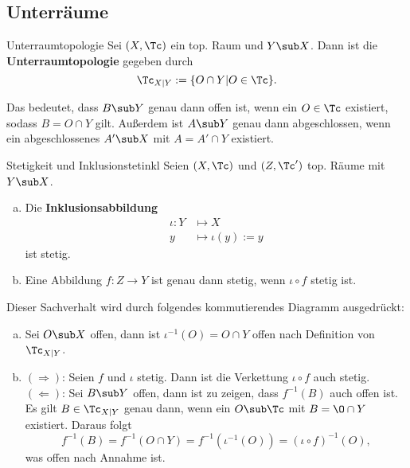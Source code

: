 \subsection{Unterräume}
\label{subsec:unterraeume}
\begin{definition}{Unterraumtopologie}
Sei $(X,\Tc)$ ein top. Raum und $Y \sub X$. Dann ist die \textbf{Unterraumtopologie} gegeben durch
\begin{equation}
\Tc_{X|Y} := \{O \cap Y|  O \in \Tc\}.
\end{equation}
\end{definition}
\begin{bemerkung}
Das bedeutet, dass $B \sub Y$ genau dann offen ist, wenn ein $O \in \Tc$ existiert, sodass $B = O \cap Y$ gilt. Außerdem ist $A \sub Y$ genau dann abgeschlossen, wenn ein abgeschlossenes $A' \sub X$ mit $A = A' \cap Y$ existiert.
\end{bemerkung}
\begin{satz}{Stetigkeit und Inklusion}{stetinkl}
Seien $(X,\Tc)$ und $(Z,\Tc')$ top. Räume mit $Y \sub X$.
\begin{enumerate}[(a)]
\item Die \textbf{Inklusionsabbildung}
\begin{equation}
\begin{split}
\iota: Y &\mapsto X\\
y &\mapsto \iota(y):=y
\end{split}
\end{equation}
ist stetig.
\item Eine Abbildung $f: Z \to Y$ ist genau dann stetig, wenn $\iota \circ f$ stetig ist.
\end{enumerate}
Dieser Sachverhalt wird durch folgendes kommutierendes Diagramm ausgedrückt:
\begin{center}
\end{center}
\end{satz}
\begin{beweis}
\begin{enumerate}[(a)]
\item Sei $O \sub X$ offen, dann ist $\iota^{-1}(O)=O \cap Y$ offen nach Definition von $\Tc_{X|Y}$.
\item $(\Rightarrow)$: Seien $f$ und $\iota$ stetig. Dann ist die Verkettung $\iota \circ f$ auch stetig.\\
$(\Leftarrow)$: Sei $B \sub Y$ offen, dann ist zu zeigen, dass $f^{-1}(B)$ auch offen ist. Es gilt $B \in \Tc_{X|Y}$ genau dann, wenn ein $O \sub \Tc$ mit $B = \O \cap Y$ existiert. Daraus folgt 
\begin{equation}
f^{-1}(B) = f^{-1}(O \cap Y) = f^{-1} (\iota^{-1}(O)) = (\iota \circ f)^{-1} (O),
\end{equation}
was offen nach Annahme ist.
\end{enumerate}
\end{beweis}
